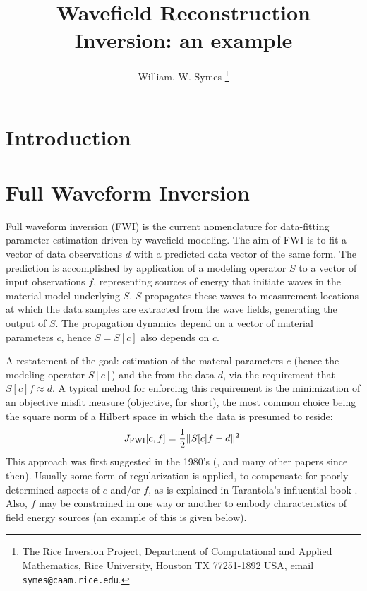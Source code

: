 \title{Wavefield Reconstruction Inversion: an example}
\author{William. W. Symes \thanks{The Rice Inversion Project,
Department of Computational and Applied Mathematics, Rice University,
Houston TX 77251-1892 USA, email {\tt symes@caam.rice.edu}.}}



\section{Introduction}

\section{Full Waveform Inversion}
Full waveform inversion (FWI) is the current nomenclature for data-fitting parameter estimation driven by wavefield modeling. The aim of FWI is to fit a vector of data observations $d$ with a predicted data vector of the same form. The prediction is accomplished by application of a modeling operator $S$ to a vector of input observations $f$, representing sources of energy that initiate waves in the material model underlying $S$. $S$ propagates these waves to measurement locations at which the data samples are extracted from the wave fields, generating the output of $S$. The propagation dynamics depend on a vector of material parameters $c$, hence $S=S[c]$ also depends on $c$.

A restatement of the goal: estimation of the materal parameters $c$ (hence the modeling operator $S[c]$) and the  from the data $d$, via the requirement that $S[c]f \approx d$. A typical mehod for enforcing this requirement is the minimization of an objective misfit measure (objective, for short), the most common choice being the square norm of a Hilbert space in which the data is presumed to reside:
\begin{equation}
  \label{eqn:deffwifull}
  J_{\rm FWI}[c,f] = \frac{1}{2}\|S[c]f -d\|^2.
\end{equation}
This approach was first suggested in the 1980's (\cite{BamChavLai:79,Tara:84a,KolbColLai:86,Crasetal:90},
and many other papers since then). Usually some form of regularization
is applied, to compensate for poorly determined aspects of $c$
and/or $f$, as is explained in Tarantola's influential book
\cite[]{Tarantola:05}. Also, $f$ may be constrained in one way or another to embody characteristics of field energy sources (an example of this is given below).

